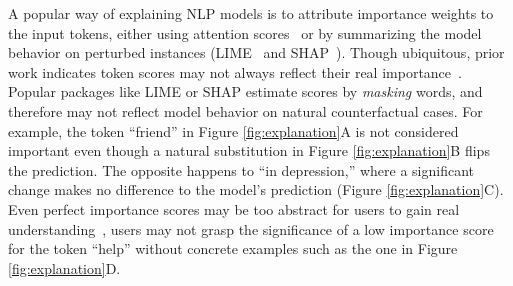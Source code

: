 



A popular way of explaining NLP models is to attribute importance weights to the input tokens, either using attention scores~\cite{wiegreffe2019attention} or by summarizing the model behavior on perturbed instances (\eg LIME~\cite{Ribeiro2016WhySI} and SHAP~\cite{NIPS2017_7062}).
Though ubiquitous, prior work indicates token scores may not always reflect their real importance~\cite{pruthi2020learning}.
Popular packages like LIME or SHAP estimate scores by \emph{masking} words, and therefore may not reflect model behavior on natural counterfactual cases. For example, the token ``friend'' in Figure \ref{fig:explanation}A is not considered important even though a natural substitution in Figure \ref{fig:explanation}B flips the prediction. The opposite happens to ``in depression,'' where a significant change makes no difference to the model's prediction (Figure \ref{fig:explanation}C).
Even perfect importance scores may be too abstract for users to gain real understanding~\cite{miller}, \eg users may not grasp the significance of a low importance score for the token ``help'' without concrete examples such as the one in Figure \ref{fig:explanation}D. 




